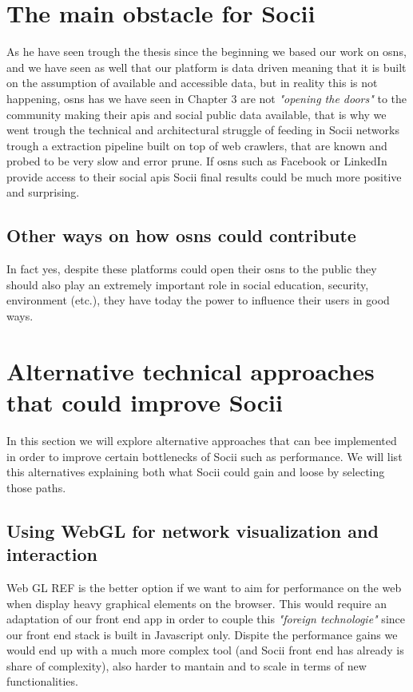 \section{The main obstacle for Socii}
As he have seen trough the thesis since the beginning we based our work on \glspl{osn}, and we have seen as well that our platform is data driven meaning that it is built on the assumption of available and accessible data, but in reality this is not happening, \glspl{osn} has we have seen in Chapter 3 are not \textit{"opening the doors"} to the community making their \glspl{api} and social public data available, that is why we went trough the technical and architectural struggle of feeding in Socii networks trough a extraction pipeline built on top of web crawlers, that are known and probed to be very slow and error prune. If \glspl{osn} such as Facebook or LinkedIn provide access to their social \glspl{api} Socii final results could be much more positive and surprising.

\subsection*{Other ways on how \glspl{osn} could contribute}
In fact yes, despite these platforms could open their \glspl{osn} to the public they should also play an extremely important role in social education, security, environment (etc.), they have today the power to influence their users in good ways.

\section{Alternative technical approaches that could improve Socii}
In this section we will explore alternative approaches that can bee implemented in order to improve certain bottlenecks of Socii such as performance. We will list this alternatives explaining both what Socii could gain and loose by selecting those paths.

\subsection{Using WebGL for network visualization and interaction}
Web GL REF is the better option if we want to aim for performance on the web when display heavy graphical elements on the browser. This would require an adaptation of our front end app in order to couple this \textit{"foreign technologie"} since our front end stack is built in Javascript only. Dispite the performance gains we would end up with a much more complex tool (and Socii front end has already is share of complexity), also harder to mantain and to scale in terms of new functionalities.

